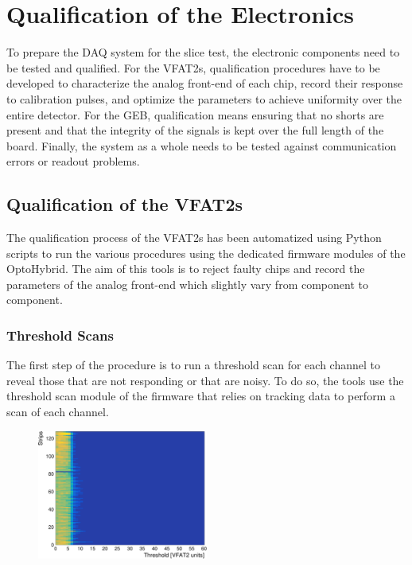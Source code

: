 \chapter{Qualification of the Electronics}
\label{chap:II-5-qualification}

  To prepare the DAQ system for the slice test, the electronic components need to be tested and qualified. For the VFAT2s, qualification procedures have to be developed to characterize the analog front-end of each chip, record their response to calibration pulses, and optimize the parameters to achieve uniformity over the entire detector. For the GEB, qualification means ensuring that no shorts are present and that the integrity of the signals is kept over the full length of the board. Finally, the system as a whole needs to be tested against communication errors or readout problems.

  \section{Qualification of the VFAT2s}

    The qualification process of the VFAT2s has been automatized using Python scripts to run the various procedures using the dedicated firmware modules of the OptoHybrid. The aim of this tools is to reject faulty chips and record the parameters of the analog front-end which slightly vary from component to component.

    \subsection{Threshold Scans}

      The first step of the procedure is to run a threshold scan for each channel to reveal those that are not responding or that are noisy. To do so, the tools use the threshold scan module of the firmware that relies on tracking data to perform a scan of each channel. 

      \begin{figure}[h!]
        \centering
        \includegraphics[width=0.5\textwidth]{img/plots/cThreshold_Channel-crop}
        \caption{}
        \label{fig:II-5-qualification-threshold}
      \end{figure}

